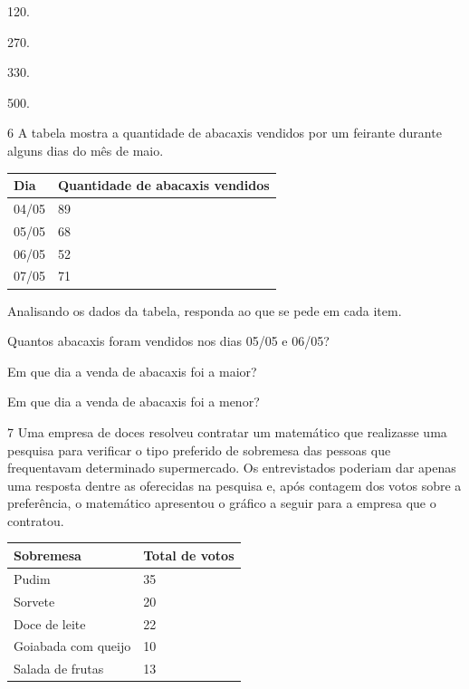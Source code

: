 \begin{minipage}{.5\textwidth}
\begin{escolha}
\item
  120.
\item
  270.
\item
  330.
\item
  500.
\end{escolha}
\end{minipage}

\num{6} A tabela mostra a quantidade de abacaxis vendidos por um feirante
durante alguns dias do mês de maio.

\begin{longtable}[]{@{}ll@{}}
\toprule
Dia & Quantidade de abacaxis vendidos\tabularnewline
\midrule
\endhead
04/05 & 89\tabularnewline
05/05 & 68\tabularnewline
06/05 & 52\tabularnewline
07/05 & 71\tabularnewline
\bottomrule
\end{longtable}

Analisando os dados da tabela, responda ao que se pede em cada item.

\begin{escolha}
\item Quantos abacaxis foram vendidos nos dias 05/05 e 06/05?
  

\item Em que dia a venda de abacaxis foi a maior?
  

\item Em que dia a venda de abacaxis foi a menor?
  
\end{escolha}

\num{7} Uma empresa de doces resolveu contratar um matemático que realizasse uma
pesquisa para verificar o tipo preferido de sobremesa das pessoas que
frequentavam determinado supermercado. Os entrevistados poderiam dar
apenas uma resposta dentre as oferecidas na pesquisa e, após contagem dos
votos sobre a preferência, o matemático apresentou o gráfico a seguir
para a empresa que o contratou.

\begin{longtable}[]{@{}ll@{}}
\toprule
Sobremesa & Total de votos\tabularnewline
\midrule
\endhead
Pudim & 35\tabularnewline
Sorvete & 20\tabularnewline
Doce de leite & 22\tabularnewline
Goiabada com queijo & 10\tabularnewline
Salada de frutas & 13\tabularnewline
\bottomrule
\end{longtable}

